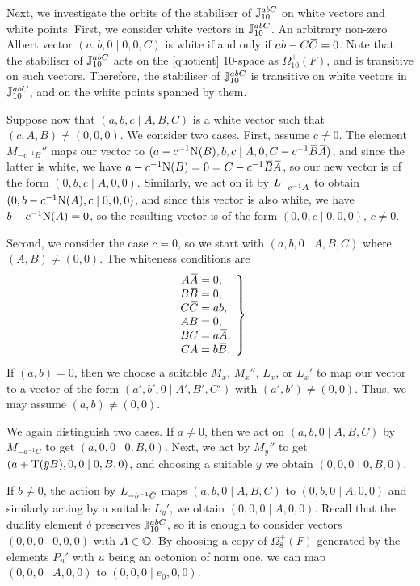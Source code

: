 Next, we investigate the orbits of the stabiliser of $\mathbb{J}_{10}^{abC}$ on white vectors and white points. First, we consider white vectors
in $\mathbb{J}_{10}^{abC}$. An arbitrary non-zero Albert vector $(a,b,0\mid 0,0,C)$ is white if and only if $a b - C\mathord{\mbox{\hspace*{0pt}}\,\overline{\!C\!\!\;}\!\:}\mbox{\hspace*{0pt}} = 0$.
Note that the stabiliser of $\mathbb{J}_{10}^{abC}$ acts on the [quotient] $10$-space as $\Omega_{10}^+(F)$, and is transitive on such vectors. 
Therefore, the stabiliser of $\mathbb{J}_{10}^{abC}$ is transitive on white vectors in
$\mathbb{J}_{10}^{abC}$, and on the white points spanned by them. 

Suppose now that $(a,b,c \mid A,B,C)$ is a white vector such that $(c,A,B) \neq (0,0,0)$. We consider two cases.
First, assume $c \neq 0$. The element $M_{-c^{-1} B}''$ maps our vector to $(a - c^{-1}\NN(B), b, c \mid A,0, C-c^{-1}\ovB \ovA)$, and since
the latter is white, we have \mbox{$a - c^{-1}\NN(B) = 0  = C - c^{-1}\ovB\ovA$}, so our new vector is of the form
$(0,b,c \mid A,0,0)$. Similarly, we act on it by $L_{-c^{-1} \mathord{\mbox{\hspace*{0pt}}\,\overline{\!A\!\!\;}\!\:}\mbox{\hspace*{0pt}}}$ to obtain $(0,b-c^{-1}\mathord{\mathrm{N}}(A),c \mid 0,0,0)$, and since this vector is also 
white, we have $b - c^{-1} \mathord{\mathrm{N}}(A) = 0$, so the resulting vector is of the form $(0,0,c\mid 0,0,0)$, $c \neq 0$. 

Second, we consider the case $c = 0$, so we start with $(a,b,0\mid A,B,C)$ where $(A,B) \neq (0,0)$. The whiteness conditions are
\begin{equation}
	\left.
	\begin{array}{r@{\;}c@{\;}l}
		A\ovA & = & 0, \\
		B\ovB & = & 0, \\
		C\ovC & = & ab, \\
		AB & = & 0, \\
		BC & = & a\ovA, \\
		CA & = & b\ovB. 
	\end{array}
	\right\}
\end{equation}
If $(a,b) = 0$, then we choose a suitable $M_x$, $M_x''$, $L_x$, or $L_x'$ to map our vector to a vector of the form
$(a',b',0\mid A',B',C')$ with $(a',b') \neq (0,0)$. Thus, we may assume $(a,b) \neq (0,0)$. 

We again distinguish two cases. 
If $a \neq 0$, then we act on $(a,b,0\mid A,B,C)$ by $M_{-a^{-1} C}$ to get $(a,0,0\mid 0,B,0)$. Next, we act by 
$M_y''$ to get \mbox{$(a + \operatorname{T}(\mathord{\mbox{\hspace*{0pt}}\,\overline{\!y\!\!\;}\!\:}\mbox{\hspace*{0pt}} B), 0, 0 \mid 0,B,0)$}, and choosing a suitable $y$ we obtain $(0,0,0\mid 0,B,0)$.

If $b \neq 0$, the action by $L_{-b^{-1} \mathord{\mbox{\hspace*{0pt}}\,\overline{\!C\!\!\;}\!\:}\mbox{\hspace*{0pt}}}$ maps $(a,b,0\mid A,B,C)$ to \mbox{$(0,b,0\mid A,0,0)$} and 
similarly acting by a suitable $L_y'$, we obtain $(0,0,0\mid A,0,0)$. Recall that the duality element $\delta$ preserves 
$\mathbb{J}_{10}^{abC}$, so it is enough to consider vectors $(0,0,0\mid 0,0,0)$ with $A \in \mathbb{O}$. By choosing a copy of $\Omega_8^+(F)$ 
generated by the elements $P_u'$ with $u$ being an octonion of norm one, we can map $(0,0,0\mid A,0,0)$ to 
$(0,0,0\mid e_0, 0,0)$.

